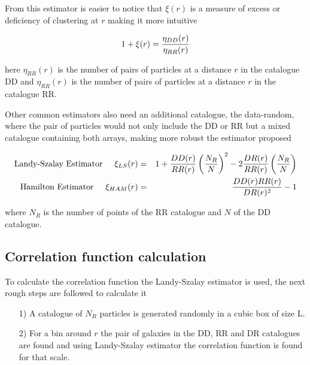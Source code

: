 From this estimator is easier to notice that $\xi(r)$ is a measure of 
excess or deficiency of clustering at $r$ making it more intuitive 

\[1+\xi(r)= \frac{\eta_{DD}(r)}{\eta_{RR}(r)}\]

here $\eta_{RR}(r)$ is the number of pairs of particles at a distance $r$ in the catalogue DD 
and $\eta_{RR}(r)$ is the number of pairs of particles at a distance $r$ in the catalogue RR. 

Other common estimators also need an additional catalogue, the data-random, where the
pair of particles would not only include the DD or RR but a mixed catalogue containing 
both arrays, making more robust the estimator proposed \cite{Est_CF}

\begin{eqnarray}
\mbox{Landy-Szalay Estimator}\hspace{0.5cm} \xi_{LS}(r)&=& 1+\frac{DD(r)}{RR(r)}\left(\frac{N_R}{N}\right)^2-2\frac{DR(r)}{RR(r)}\left(\frac{N_R}{N}\right) \nonumber \\
\mbox{Hamilton Estimator}  \hspace{0.5cm} \xi_{HAM}(r)&=&\frac{DD(r)RR(r)}{DR(r)^2}-1 \nonumber 
\end{eqnarray}

where $N_R$ is the number of points of the RR catalogue and $N$ of the DD catalogue.

\subsection{Correlation function calculation}

To calculate the correlation function the Landy-Szalay estimator is used, the next
rough steps are followed to calculate it

\begin{enumerate}

\item[1)] A catalogue of $N_R$ particles is generated randomly in a cubic box of size L.

\item[2)] For a bin around $r$ the pair of galaxies in the DD, RR and DR catalogues are found
and using Landy-Szalay estimator the correlation function is found for that scale. 

\end{enumerate}